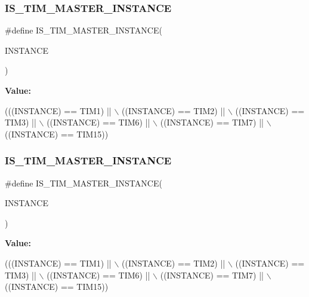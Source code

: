 \subsubsection{\texorpdfstring{I\+S\+\_\+\+T\+I\+M\+\_\+\+M\+A\+S\+T\+E\+R\+\_\+\+I\+N\+S\+T\+A\+N\+CE}{IS\_TIM\_MASTER\_INSTANCE}\hspace{0.1cm}{\footnotesize\ttfamily [13/16]}}
{\footnotesize\ttfamily \#define I\+S\+\_\+\+T\+I\+M\+\_\+\+M\+A\+S\+T\+E\+R\+\_\+\+I\+N\+S\+T\+A\+N\+CE(\begin{DoxyParamCaption}\item[{}]{I\+N\+S\+T\+A\+N\+CE }\end{DoxyParamCaption})}

{\bfseries Value\+:}
\begin{DoxyCode}
(((INSTANCE) == TIM1)    || \(\backslash\)
   ((INSTANCE) == TIM2)    || \(\backslash\)
   ((INSTANCE) == TIM3)    || \(\backslash\)
   ((INSTANCE) == TIM6)    || \(\backslash\)
   ((INSTANCE) == TIM7)    || \(\backslash\)
   ((INSTANCE) == TIM15))
\end{DoxyCode}
\mbox{\label{group___exported__macro_ga98104b1522d066b0c20205ca179d0eba}} 
\subsubsection{\texorpdfstring{I\+S\+\_\+\+T\+I\+M\+\_\+\+M\+A\+S\+T\+E\+R\+\_\+\+I\+N\+S\+T\+A\+N\+CE}{IS\_TIM\_MASTER\_INSTANCE}\hspace{0.1cm}{\footnotesize\ttfamily [14/16]}}
{\footnotesize\ttfamily \#define I\+S\+\_\+\+T\+I\+M\+\_\+\+M\+A\+S\+T\+E\+R\+\_\+\+I\+N\+S\+T\+A\+N\+CE(\begin{DoxyParamCaption}\item[{}]{I\+N\+S\+T\+A\+N\+CE }\end{DoxyParamCaption})}

{\bfseries Value\+:}
\begin{DoxyCode}
(((INSTANCE) == TIM1)    || \(\backslash\)
   ((INSTANCE) == TIM2)    || \(\backslash\)
   ((INSTANCE) == TIM3)    || \(\backslash\)
   ((INSTANCE) == TIM6)    || \(\backslash\)
   ((INSTANCE) == TIM7)    || \(\backslash\)
   ((INSTANCE) == TIM15))
\end{DoxyCode}
\mbox{\label{group___exported__macro_ga98104b1522d066b0c20205ca179d0eba}} 
